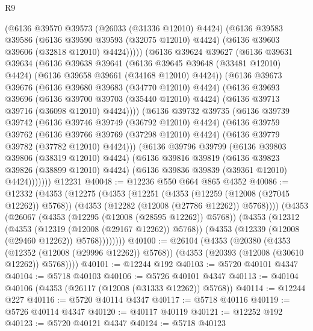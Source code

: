 \begin{lexlean}{R9}
\begin{coremodule}
            (@6136
              @39570
              @39573
              (@26033 (@31336 @12010) @4424)
              (@6136
                @39583
                @39586
                (@6136 @39590 @39593 (@32075 @12010) @4424)
                (@6136 @39603 @39606 (@32818 @12010) @4424)))))
        (@6136
          @39624
          @39627
          (@6136
            @39631
            @39634
            (@6136
              @39638
              @39641
              (@6136 @39645 @39648 (@33481 @12010) @4424)
              (@6136 @39658 @39661 (@34168 @12010) @4424))
            (@6136
              @39673
              @39676
              (@6136 @39680 @39683 (@34770 @12010) @4424)
              (@6136
                @39693
                @39696
                (@6136 @39700 @39703 (@35440 @12010) @4424)
                (@6136 @39713 @39716 (@36098 @12010) @4424))))
          (@6136
            @39732
            @39735
            (@6136
              @39739
              @39742
              (@6136 @39746 @39749 (@36792 @12010) @4424)
              (@6136
                @39759
                @39762
                (@6136 @39766 @39769 (@37298 @12010) @4424)
                (@6136 @39779 @39782 (@37782 @12010) @4424)))
            (@6136
              @39796
              @39799
              (@6136 @39803 @39806 (@38319 @12010) @4424)
              (@6136
                @39816
                @39819
                (@6136 @39823 @39826 (@38899 @12010) @4424)
                (@6136 @39836 @39839 (@39361 @12010) @4424)))))))
    @12231
@40048 := @12236 @550 @664 @865 @4352
@40086 := @12332
    (@4353
      (@12275
        (@4353
          (@12251
            (@4353 (@12259 (@12008 (@27045 @12262)) @5768))
            (@4353 (@12282 (@12008 (@27786 @12262)) @5768))))
        (@4353
          (@26067
            (@4353 (@12295 (@12008 (@28595 @12262)) @5768))
            (@4353
              (@12312
                (@4353 (@12319 (@12008 (@29167 @12262)) @5768))
                (@4353 (@12339 (@12008 (@29460 @12262)) @5768))))))))
@40100 := @26104
    (@4353
      (@20380
        (@4353 (@12352 (@12008 (@29996 @12262)) @5768))
        (@4353 (@20393 (@12008 (@30610 @12262)) @5768))))
@40101 := @12244 @192
@40103 := @5720 @40101 @4347
@40104 := @5718 @40103
@40106 := @5726 @40101 @4347
@40113 := @40104 @40106 (@4353 (@26117 (@12008 (@31333 @12262)) @5768))
@40114 := @12244 @227
@40116 := @5720 @40114 @4347
@40117 := @5718 @40116
@40119 := @5726 @40114 @4347
@40120 := @40117 @40119
@40121 := @12252 @192
@40123 := @5720 @40121 @4347
@40124 := @5718 @40123

\end{coremodule}
\end{lexlean}
